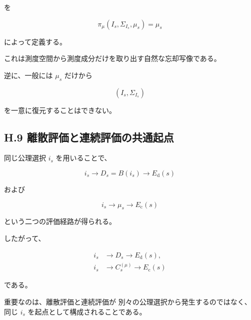 \documentclass[a4paper,11pt]{article}
\begin{document}
を

\begin{equation}
    \boxed{
        \pi_\mu
        (I_s,\Sigma_{I_s},\mu_s)
        =
        \mu_s
    }
\end{equation}

によって定義する。

これは測度空間から測度成分だけを取り出す自然な忘却写像である。

逆に、一般には $\mu_s$ だけから

\begin{equation}
    (I_s,\Sigma_{I_s})
\end{equation}

を一意に復元することはできない。


\subsection{H.9 離散評価と連続評価の共通起点}

同じ公理選択 $i_s$ を用いることで、

\begin{equation}
    i_s
    \longrightarrow
    D_s=B(i_s)
    \longrightarrow
    E_{\mathrm d}(s)
\end{equation}

および

\begin{equation}
    i_s
    \longrightarrow
    \mu_s
    \longrightarrow
    E_{\mathrm c}(s)
\end{equation}

という二つの評価経路が得られる。

したがって、

\begin{equation}
    \boxed{
    \begin{aligned}
        i_s
        &\longrightarrow
        D_s
        \longrightarrow
        E_{\mathrm d}(s),
        \\[2mm]
        i_s
        &\longrightarrow
        C_s^{(\mu)}
        \longrightarrow
        E_{\mathrm c}(s)
    \end{aligned}
    }
\end{equation}

である。

重要なのは、離散評価と連続評価が
別々の公理選択から発生するのではなく、
同じ $i_s$ を起点として構成されることである。
\end{document}
